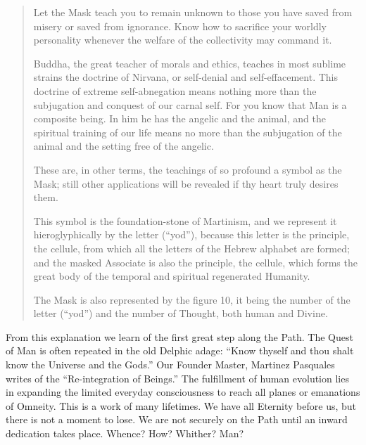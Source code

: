 \begin{quote}
	 Let the Mask teach you to remain unknown to those you have saved from misery or saved
	from ignorance. Know how to sacrifice your worldly personality whenever the welfare of the
	collectivity may command it. 
	
	Buddha, the great teacher of morals and ethics, teaches in most sublime strains the doctrine
	of Nirvana, or self-denial and self-effacement. This doctrine of extreme self-abnegation
	means nothing more than the subjugation and conquest of our carnal self. For you know that
	Man is a composite being. In him he has the angelic and the animal, and the spiritual training
	of our life means no more than the subjugation of the animal and the setting free of the
	angelic.
	
	These are, in other terms, the teachings of so profound a symbol as the Mask; still other
	applications will be revealed if thy heart truly desires them. 
	
	This symbol is the foundation-stone of Martinism, and we represent it hieroglyphically by
	the letter \hebyod{} (``yod''), because this letter is the principle, the cellule, from which all the letters of
	the Hebrew alphabet are formed; and the masked Associate is also the principle, the cellule,
	which forms the great body of the temporal and spiritual regenerated Humanity. 
	
	The Mask is also represented by the figure 10, it being the number of the letter \hebyod{} (``yod'') and
	the number of Thought, both human and Divine. 

\end{quote}

From this explanation we learn of the first great step along the Path. The Quest of Man is often
repeated in the old Delphic adage: ``Know thyself and thou shalt know the Universe and the Gods.''
Our Founder Master, Martinez Pasquales writes of the ``Re-integration of Beings.'' The fulfillment of
human evolution lies in expanding the limited everyday consciousness to reach all planes or
emanations of Omneity. This is a work of many lifetimes. We have all Eternity before us, but there is
not a moment to lose. We are not securely on the Path until an inward dedication takes place.
Whence? How? Whither? Man? 

